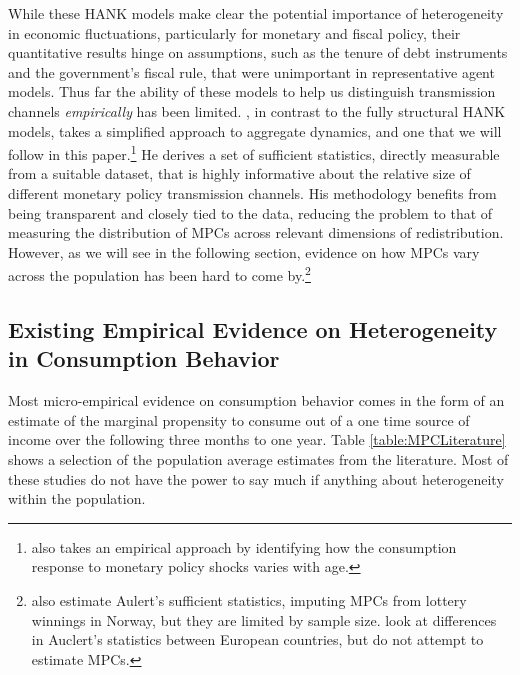 \documentclass[titlepage]{\econtex}\newcommand{\texname}{ConsumptionHeterogeneity}
\begin{document}
While these HANK models make clear the potential importance of heterogeneity in economic fluctuations, particularly for monetary and fiscal policy, their quantitative results hinge on assumptions, such as the tenure of debt instruments and the government's fiscal rule, that were unimportant in representative agent models. Thus far the ability of these models to help us distinguish transmission channels \textit{empirically} has been limited. \cite{auclert_monetary_2017}, in contrast to the fully structural HANK models, takes a simplified approach to aggregate dynamics, and one that we will follow in this paper.\footnote{\cite{wong_population_2016} also takes an empirical approach by identifying how the consumption response to monetary policy shocks varies with age.} He derives a set of sufficient statistics, directly measurable from a suitable dataset, that is highly informative about the  relative size of different monetary policy transmission channels. His methodology benefits from being transparent and closely tied to the data, reducing the problem to that of measuring the distribution of MPCs across relevant dimensions of redistribution. However, as we will see in the following section, evidence on how MPCs vary across the population has been hard to come by.\footnote{\cite{fagereng_mpc_2016} also estimate Aulert's sufficient statistics, imputing MPCs from lottery winnings in Norway, but they are limited by sample size. \cite{ampudia_monetary_2018} look at differences in Auclert's statistics between European countries, but do not attempt to estimate MPCs.} 

\subsection{Existing Empirical Evidence on Heterogeneity in Consumption Behavior} \label{MPCEmpirics}
Most micro-empirical evidence on consumption behavior comes in the form of an estimate of the marginal propensity to consume out of a one time source of income over the following three months to one year. Table \ref{table:MPCLiterature} shows a selection of the population average estimates from the literature. Most of these studies do not have the power to say much if anything about heterogeneity within the population.
\end{document}
